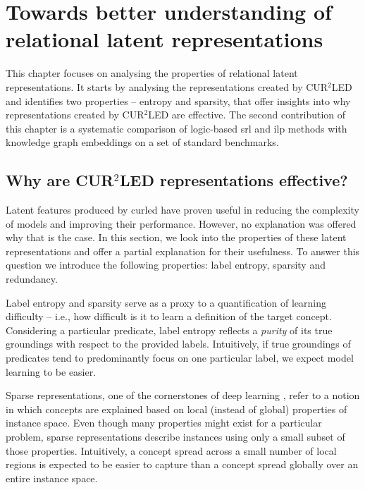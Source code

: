 \chapter{Towards better understanding of relational latent representations}\label{ch:embeddinganalysis}


This chapter focuses on analysing the properties of relational latent representations.
It starts by analysing the representations created by CUR$^2$LED and identifies two properties -- entropy and sparsity, that offer insights into why representations created by CUR$^2$LED are effective.
The second contribution of this chapter is a systematic comparison of logic-based \gls{srl} and \gls{ilp} methods with knowledge graph embeddings on a set of standard benchmarks.



\section{Why are CUR$^2$LED representations effective?}

Latent features produced by \gls{curled} have proven useful in reducing the complexity of models and improving their performance.
However, no explanation was offered why that is the case.
In this section, we look into the properties of these latent representations and offer a partial explanation for their usefulness.
To answer this question we introduce the following properties: label entropy, sparsity and redundancy.



Label entropy and sparsity serve as a proxy to a quantification of learning difficulty -- i.e., how difficult is it to learn a definition of the target concept.
Considering a particular predicate, label entropy reflects a \textit{purity} of its true groundings with respect to the provided labels.
Intuitively, if true groundings of predicates tend to predominantly focus on one particular label, we expect model learning to be easier.


Sparse representations, one of the cornerstones of deep learning \cite{Bengio2013RLR}, refer to a notion in which concepts are explained based on local (instead of global) properties of instance space.
Even though many properties might exist for a particular problem, sparse representations describe instances using only a small subset of those properties. 
Intuitively, a concept spread across a small number of local regions is expected to be easier to capture than a concept spread globally over an entire instance space.



